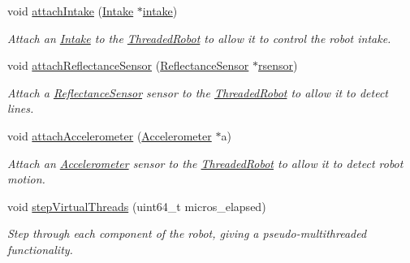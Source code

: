 \begin{DoxyCompactItemize}
void \hyperlink{class_threaded_robot_a391a0e982563eaea9dbf60b9d63b72da}{attach\+Intake} (\hyperlink{class_intake}{Intake} $\ast$\hyperlink{class_threaded_robot_ac4e32d1373e0d8a887c29378c002783f}{intake})
\begin{DoxyCompactList}\small\item\em Attach an \hyperlink{class_intake}{Intake} to the \hyperlink{class_threaded_robot}{Threaded\+Robot} to allow it to control the robot intake. \end{DoxyCompactList}\item 
void \hyperlink{class_threaded_robot_a51cbd0787fa757506942c0f36780983e}{attach\+Reflectance\+Sensor} (\hyperlink{class_reflectance_sensor}{Reflectance\+Sensor} $\ast$\hyperlink{class_threaded_robot_a6dcf388032425561c387f153ea141c79}{rsensor})
\begin{DoxyCompactList}\small\item\em Attach a \hyperlink{class_reflectance_sensor}{Reflectance\+Sensor} sensor to the \hyperlink{class_threaded_robot}{Threaded\+Robot} to allow it to detect lines. \end{DoxyCompactList}\item 
void \hyperlink{class_threaded_robot_a5c9752f8b7d97689f8b5f1c4bf87ad2d}{attach\+Accelerometer} (\hyperlink{class_accelerometer}{Accelerometer} $\ast$a)
\begin{DoxyCompactList}\small\item\em Attach an \hyperlink{class_accelerometer}{Accelerometer} sensor to the \hyperlink{class_threaded_robot}{Threaded\+Robot} to allow it to detect robot motion. \end{DoxyCompactList}\item 
void \hyperlink{class_threaded_robot_ae5545fb683a84aec9bda34a2c9bba228}{step\+Virtual\+Threads} (uint64\+\_\+t micros\+\_\+elapsed)
\begin{DoxyCompactList}\small\item\em Step through each component of the robot, giving a pseudo-\/multithreaded functionality. \end{DoxyCompactList}\end{DoxyCompactItemize}
